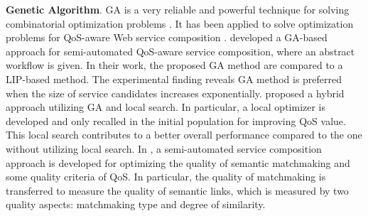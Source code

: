 \textbf{Genetic Algorithm}. 
GA is a very reliable and powerful technique for solving combinatorial optimization problems \cite{srinivas1994genetic}. It has been applied to solve optimization problems for QoS-aware Web service composition \cite{wang2012survey}. \cite{canfora2005approach} developed a GA-based approach for semi-automated QoS-aware service composition, where an abstract workflow is given. In their work, the proposed GA method are compared to a LIP-based method. The experimental finding reveals GA method is preferred when the size of service candidates increases exponentially. \cite{tang2010hybrid} proposed a hybrid approach utilizing GA and local search. In particular, a local optimizer is developed and only recalled in the initial population for improving QoS value. This local search contributes to a better overall performance compared to the one without utilizing local search. In \cite{lecue2009optimizing}, a semi-automated service composition approach is developed for optimizing the quality of semantic matchmaking and some quality criteria of QoS. In particular, the quality of matchmaking is transferred to measure the quality of semantic links, which is measured by two quality aspects: matchmaking type and degree of similarity.

